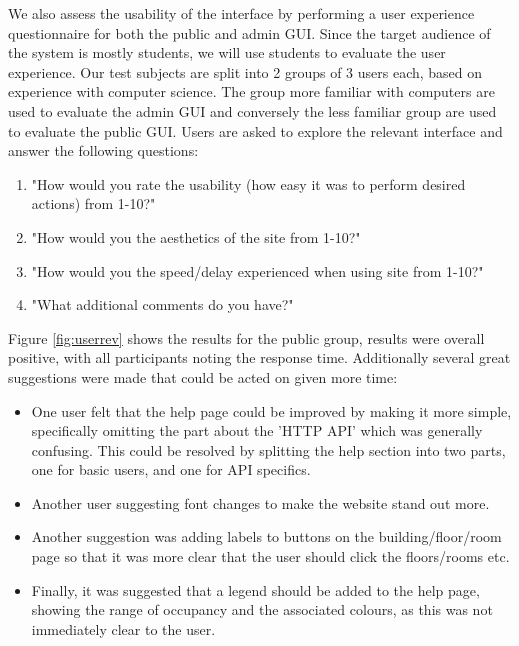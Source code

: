 \documentclass{l4proj}
\begin{document}
We also assess the usability of the interface by performing a user experience questionnaire for both the public and admin GUI. Since the target audience of the system is mostly students, we will use students to evaluate the user experience. Our test subjects are split into 2 groups of 3 users each, based on experience with computer science. The group more familiar with computers are used to evaluate the admin GUI and conversely the less familiar group are used to evaluate the public GUI. Users are asked to explore the relevant interface and answer the following questions:

\begin{enumerate}	
  \item "How would you rate the usability (how easy it was to perform desired actions) from 1-10?"
  \item "How would you the aesthetics of the site from 1-10?"
  \item "How would you the speed/delay experienced when using site from 1-10?"
  \item "What additional comments do you have?"
\end{enumerate}

Figure \ref{fig:userrev} shows the results for the public group, results were overall positive, with all participants noting the response time. Additionally several great suggestions were made that could be acted on given more time:
\begin{itemize}	
  \item One user felt that the help page could be improved by making it more simple, specifically omitting the part about the 'HTTP API' which was generally confusing. This could be resolved by splitting the help section into two parts, one for basic users, and one for API specifics.
  \item Another user suggesting font changes to make the website stand out more.
  \item Another suggestion was adding labels to buttons on the building/floor/room page so that it was more clear that the user should click the floors/rooms etc.
  \item Finally, it was suggested that a legend should be added to the help page, showing the range of occupancy and the associated colours, as this was not immediately clear to the user.
\end{itemize}
	
\end{document}

